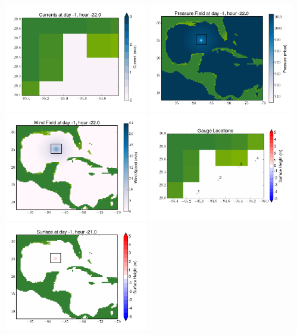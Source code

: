 \documentclass[11pt]{article}
\begin{document}
\vskip 10pt 
\includegraphics[width=0.475\textwidth]{frame0026fig7.png}
\includegraphics[width=0.475\textwidth]{frame0026fig8.png}
\vskip 10pt 
\includegraphics[width=0.475\textwidth]{frame0026fig9.png}
\includegraphics[width=0.475\textwidth]{frame0026fig10.png}
\vskip 10pt 
\includegraphics[width=0.475\textwidth]{frame0027fig1.png}
\end{document}
